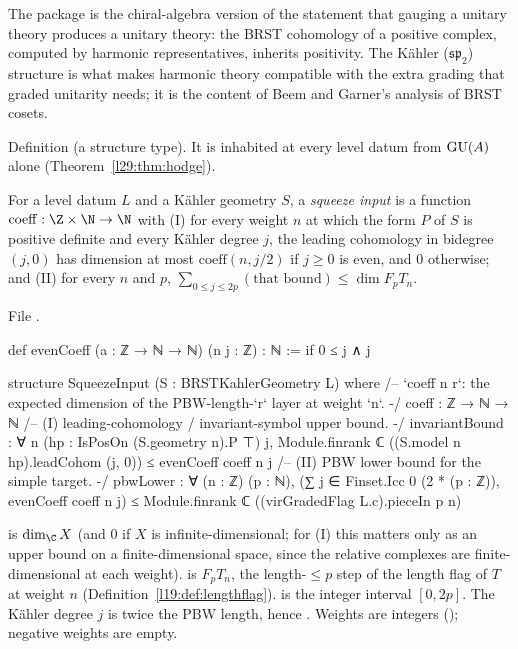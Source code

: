 \begin{physics}
The package is the chiral-algebra version of the statement that gauging a unitary theory produces a unitary theory:
the BRST cohomology of a positive complex, computed by harmonic representatives, inherits positivity. The Kähler
($\mathfrak{sp}_2$) structure is what makes harmonic theory compatible with the extra grading that graded unitarity
needs; it is the content of Beem and Garner's analysis of BRST cosets.
\end{physics}

\begin{status}
Definition (a structure type). It is inhabited at every level datum from $\mathrm{GU}(A)$ alone
(Theorem~\ref{l29:thm:hodge}).
\end{status}

\begin{definition}\label{l29:def:squeeze}
For a level datum $L$ and a Kähler geometry $S$, a \emph{squeeze input} is a function
$\mathrm{coeff}:\Z\times\N\to\N$ with (I) for every weight $n$ at which the form $P$ of $S$ is positive definite and every
Kähler degree $j$, the leading cohomology in
bidegree $(j,0)$ has dimension at most $\mathrm{coeff}(n,j/2)$ if $j\ge0$ is even, and $0$ otherwise; and (II) for every
$n$ and $p$, $\sum_{0\le j\le 2p}(\text{that bound})\le\dim F_pT_n$.
\end{definition}

\noindent File .
\begin{leancode}
def evenCoeff (a : ℤ → ℕ → ℕ) (n j : ℤ) : ℕ :=
  if 0 ≤ j ∧ j %

structure SqueezeInput (S : BRSTKahlerGeometry L) where
  /-- `coeff n r`: the expected dimension of the PBW-length-`r` layer at weight `n`. -/
  coeff : ℤ → ℕ → ℕ
  /-- (I) leading-cohomology / invariant-symbol upper bound. -/
  invariantBound : ∀ n (hp : IsPosOn (S.geometry n).P ⊤) j,
    Module.finrank ℂ ((S.model n hp).leadCohom (j, 0)) ≤ evenCoeff coeff n j
  /-- (II) PBW lower bound for the simple target. -/
  pbwLower : ∀ (n : ℤ) (p : ℕ),
    (∑ j ∈ Finset.Icc 0 (2 * (p : ℤ)), evenCoeff coeff n j) ≤
      Module.finrank ℂ ((virGradedFlag L.c).pieceIn p n)
\end{leancode}

\begin{dictionary}
 is $\dim_\C X$ (and $0$ if $X$ is infinite-dimensional; for (I) this matters only as an
upper bound on a finite-dimensional space, since the relative complexes are finite-dimensional at each weight).
 is $F_pT_n$, the length-$\le p$ step of the length flag of $T$ at weight $n$
(Definition~\ref{l19:def:lengthflag}).  is the integer interval $[0,2p]$. The Kähler degree
$j$ is twice the PBW length, hence . Weights are integers (); negative weights are empty.
\end{dictionary}

